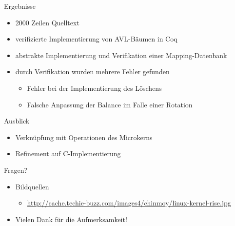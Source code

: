\documentclass{beamer}
\begin{document}
\begin{frame}{Ergebnisse}
  \begin{itemize}
    \item 2000 Zeilen Quelltext
    \item verifizierte Implementierung von AVL-Bäumen in Coq
    \item abstrakte Implementierung und Verifikation einer Mapping-Datenbank
    \item durch Verifikation wurden mehrere Fehler gefunden 
      \begin{itemize}
        \item Fehler bei der Implementierung des Löschens
        \item Falsche Anpassung der Balance im Falle einer Rotation
      \end{itemize}
  \end{itemize}
\end{frame}

\begin{frame}{Ausblick}
  \begin{itemize}
    \item Verknüpfung mit Operationen des Microkerns
    \item Refinement auf C-Implementierung
  \end{itemize}
\end{frame}

\begin{frame}{Fragen?}
  \begin{itemize}
    \item Bildquellen
      \begin{itemize}
        \item \url{http://cache.techie-buzz.com/images4/chinmoy/linux-kernel-rise.jpg}
      \end{itemize}
    \item \large Vielen Dank für die Aufmerksamkeit!
  \end{itemize}
\end{frame}
\end{document}
